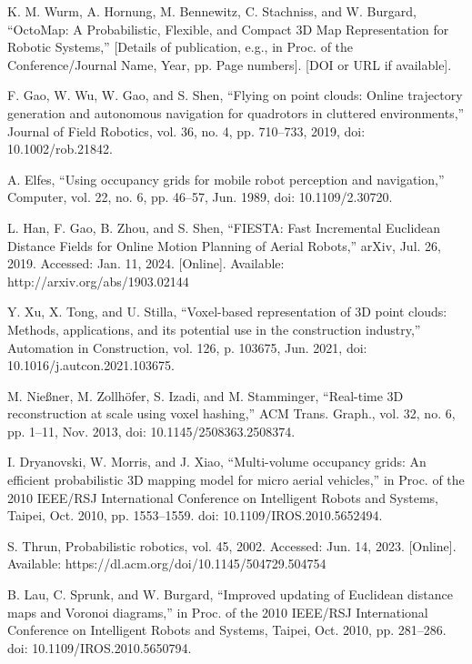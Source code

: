 \documentclass[letterpaper, 10 pt, conference]{ieeeconf}  %
\begin{document}
\begin{thebibliography}{99}
 K. M. Wurm, A. Hornung, M. Bennewitz, C. Stachniss, and W. Burgard, “OctoMap: A Probabilistic, Flexible, and Compact 3D Map Representation for Robotic Systems,” [Details of publication, e.g., in Proc. of the Conference/Journal Name, Year, pp. Page numbers]. [DOI or URL if available].

 F. Gao, W. Wu, W. Gao, and S. Shen, “Flying on point clouds: Online trajectory generation and autonomous navigation for quadrotors in cluttered environments,” Journal of Field Robotics, vol. 36, no. 4, pp. 710–733, 2019, doi: 10.1002/rob.21842.

 A. Elfes, “Using occupancy grids for mobile robot perception and navigation,” Computer, vol. 22, no. 6, pp. 46–57, Jun. 1989, doi: 10.1109/2.30720.

 L. Han, F. Gao, B. Zhou, and S. Shen, “FIESTA: Fast Incremental Euclidean Distance Fields for Online Motion Planning of Aerial Robots,” arXiv, Jul. 26, 2019. Accessed: Jan. 11, 2024. [Online]. Available: http://arxiv.org/abs/1903.02144

 Y. Xu, X. Tong, and U. Stilla, “Voxel-based representation of 3D point clouds: Methods, applications, and its potential use in the construction industry,” Automation in Construction, vol. 126, p. 103675, Jun. 2021, doi: 10.1016/j.autcon.2021.103675.

 M. Nießner, M. Zollhöfer, S. Izadi, and M. Stamminger, “Real-time 3D reconstruction at scale using voxel hashing,” ACM Trans. Graph., vol. 32, no. 6, pp. 1–11, Nov. 2013, doi: 10.1145/2508363.2508374.

 I. Dryanovski, W. Morris, and J. Xiao, “Multi-volume occupancy grids: An efficient probabilistic 3D mapping model for micro aerial vehicles,” in Proc. of the 2010 IEEE/RSJ International Conference on Intelligent Robots and Systems, Taipei, Oct. 2010, pp. 1553–1559. doi: 10.1109/IROS.2010.5652494.

 S. Thrun, Probabilistic robotics, vol. 45, 2002. Accessed: Jun. 14, 2023. [Online]. Available: https://dl.acm.org/doi/10.1145/504729.504754

 B. Lau, C. Sprunk, and W. Burgard, “Improved updating of Euclidean distance maps and Voronoi diagrams,” in Proc. of the 2010 IEEE/RSJ International Conference on Intelligent Robots and Systems, Taipei, Oct. 2010, pp. 281–286. doi: 10.1109/IROS.2010.5650794.


\end{thebibliography}
\end{document}
